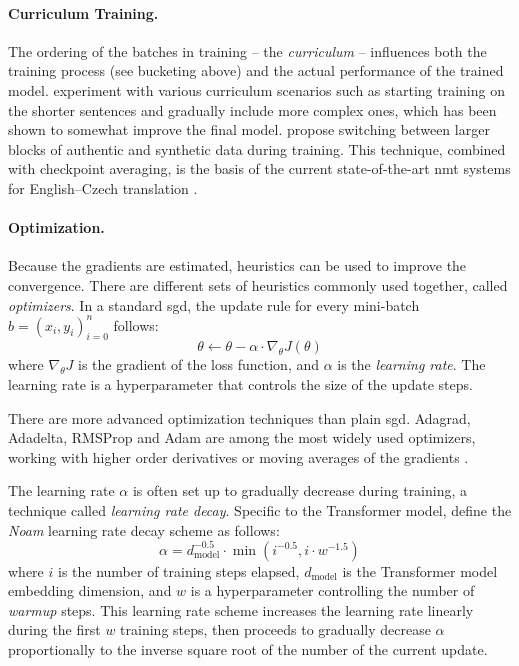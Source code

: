\paragraph{Curriculum Training.} The ordering of the batches in training -- the
\emph{curriculum} -- influences both the training process (see bucketing above)
and the actual performance of the trained
model. \citet{kocmi-bojar-2017-curriculum} experiment with various curriculum
scenarios such as starting training on the shorter sentences and gradually
include more complex ones, which has been shown to somewhat improve the final
model. \citet{popel-etal-2020-transforming} propose switching between larger
blocks of authentic and synthetic data during training. This technique,
combined with checkpoint averaging, is the basis of the current
state-of-the-art \ac{nmt} systems for English--Czech translation
\citep{barrault-etal-2020-findings}. 

\paragraph{Optimization.}
Because the gradients are estimated, heuristics can be used to improve the
convergence. There are different sets of heuristics commonly used together,
called \emph{optimizers}. In a standard \ac{sgd}, the update rule for every
mini-batch $b = (x_i, y_i)_{i=0}^{n}$ follows:
%
\begin{equation}
  \theta \gets \theta - \alpha  \cdot \nabla_{\theta}  J(\theta)
\end{equation}
%
where $\nabla_{\theta} J$ is the gradient of the loss function, and
$\alpha$ is the \emph{learning rate}. The learning rate is a hyperparameter
that controls the size of the update steps.

There are more advanced optimization techniques than plain \ac{sgd}. Adagrad,
Adadelta, RMSProp and Adam are among the most widely used optimizers, working
with higher order derivatives or moving averages of the gradients
\citep{duchi2011adaptive,zeiler2012adadelta,tieleman2012lecture,kingma2014adam}.

The learning rate $\alpha$ is often set up to gradually decrease during
training, a technique called \emph{learning rate decay}. Specific to the
Transformer model, \citet{vaswani2017attention} define the \emph{Noam} learning
rate decay scheme as follows:
%
\begin{equation}
  \alpha =  d_{\text{model}}^{-0.5} \cdot \min( i^{-0.5}, i \cdot  w^{-1.5})
\end{equation}
%
where $i$ is the number of training steps elapsed, $d_{\text{model}}$ is the
Transformer model embedding dimension, and $w$ is a hyperparameter controlling
the number of \emph{warmup} steps. This learning rate scheme increases the
learning rate linearly during the first $w$ training steps, then proceeds to
gradually decrease $\alpha$ proportionally to the inverse square root of the
number of the current update. 

